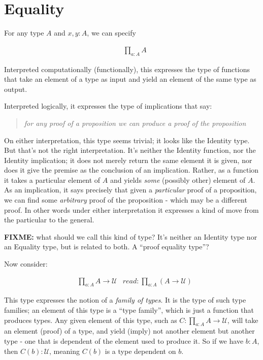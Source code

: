 \documentclass{article}
\begin{document}
\section{Equality}

For any type \(A\) and \(x,y:A\), we can specify

\begin{align}
  &\prod\limits_{a:A}A
\end{align}

Interpreted computationally (functionally), this expresses
the type of functions that take an element of a type as input and
yield an element of the same type as output.

Interpreted logically, it expresses the type of implications that say:

\begin{quote}
\textit{for any proof of a proposition we can produce a proof of the proposition}
\end{quote}

On either interpretation, this type seems trivial; it looks like the
Identity type.  But that's not the right interpretation.  It's neither
the Identity function, nor the Identity implication; it does not
merely return the same element it is given, nor does it give the
premise as the conclusion of an implication.  Rather, as a function it
takes a particular element of \(A\) and yields \emph{some} (possibly
other) element of \(A\).  As an implication, it says precisely that
given a \emph{particular} proof of a proposition, we can find some
\emph{arbitrary} proof of the proposition - which may be a different
proof.  In other words under either interpretation it expresses a kind
of move from the particular to the general.

\textbf{FIXME:} what should we call this kind of type?  It's neither
an Identity type nor an Equality type, but is related to both.  A
``proof equality type''?

Now consider:

\begin{align}
  &\prod\limits_{a:A}A\to\mathcal{U} & \textit{read:}\ \prod\limits_{a:A}(A\to\mathcal{U})
\end{align}

This type expresses the notion of a \emph{family of types}.  It is the
type of such type families; an element of this type is a ``type
family'', which is just a function that produces types.  Any given
element of this type, such as
\(C\colon\prod\limits_{a:A}A\to\mathcal{U}\), will take an element
(proof) of a type, and yield (imply) not another element but another
type - one that is dependent of the element used to produce it.  So if we
have \(b\colon A\), then \(C(b)\colon\mathcal{U}\), meaning \(C(b)\)
is a type dependent on \(b\).
\end{document}
